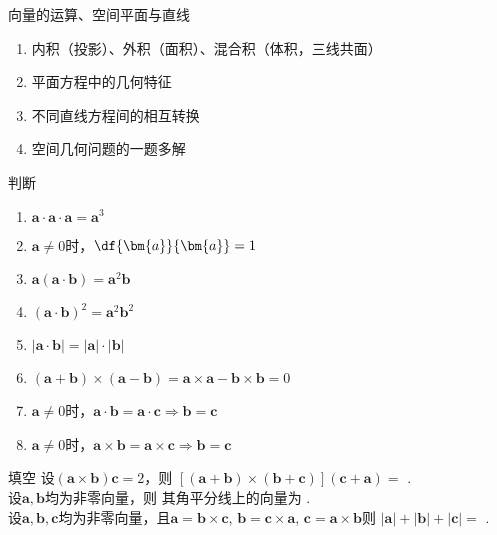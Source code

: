 \begin{frame}{向量的运算、空间平面与直线}
	\linespread{1.2}
	\begin{enumerate}
	  \item 内积（投影）、外积（面积）、混合积（体积，三线共面）
	  \item 平面方程中的几何特征
	  \item 不同直线方程间的相互转换
	  \item 空间几何问题的一题多解
	\end{enumerate}
\end{frame}

\begin{frame}{判断}
	\linespread{1.2}
	\begin{enumerate}
	  \item $\bm{a}\cdot\bm{a}\cdot\bm{a}=\bm{a}^3$\quad\pause\ba{$\times$}\pause
	  \item $\bm{a}\ne 0$时，$\df{\bm{a}}{\bm{a}}=1$\quad\pause\ba{$\times$}\pause
	  \item $\bm{a}(\bm{a}\cdot\bm{b})=\bm{a}^2\bm{b}$
	    \quad\pause\ba{$\times$}\pause
	  \item $(\bm{a}\cdot\bm{b})^2=\bm{a}^2\bm{b}^2$\quad\pause\ba{$\times$}\pause
	  \item $|\bm{a}\cdot\bm{b}|=|\bm{a}|\cdot|\bm{b}|$
		\quad\pause\ba{$\times$}\pause
	  \item $(\bm{a}+\bm{b})\times(\bm{a}-\bm{b})=\bm{a}\times\bm{a}
  		-\bm{b}\times\bm{b}=0$
  		\quad\pause\ba{$\times$}\pause
  	  \item $\bm{a}\ne 0$时，$\bm{a}\cdot\bm{b}
  	  	=\bm{a}\cdot\bm{c}\Rightarrow\bm{b}=\bm{c}$
  	  	\quad\pause\ba{$\times$}\pause
  	  \item  $\bm{a}\ne 0$时，$\bm{a}\times\bm{b}
  	  	=\bm{a}\times\bm{c}\Rightarrow\bm{b}=\bm{c}$
  	  	\quad\pause\ba{$\times$}
	\end{enumerate}
\end{frame}

\begin{frame}{填空}
	\linespread{1.2}
	\;设$(\bm{a}\times\bm{b})\bm{c}=2$，则
	$[(\bm{a}+\bm{b})\times(\bm{b}+\bm{c})](\bm{c}+\bm{a})=$
	\underline{\;}.\\[1em]
	
	\;设$\bm{a},\bm{b}$均为非零向量，则
	其角平分线上的向量为
	\underline{\;}.\\[1em]
	
	\;设$\bm{a},\bm{b},\bm{c}$均为非零向量，且$\bm{a}=\bm{b}\times\bm{c}$,
	$\bm{b}=\bm{c}\times\bm{a}$,
	$\bm{c}=\bm{a}\times\bm{b}$则
	$|\bm{a}|+|\bm{b}|+|\bm{c}|=$
	\underline{\;}.\\[1em]
\end{frame}

